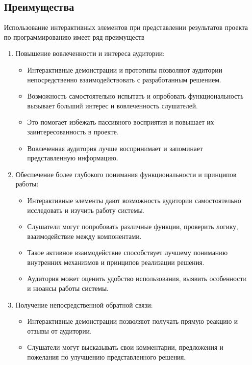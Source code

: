     \subsection{Преимущества}
    Использование интерактивных элементов при представлении результатов проекта по программированию имеет ряд преимуществ
    \begin{enumerate}
        \item Повышение вовлеченности и интереса аудитории:
            \begin{itemize}
                \item Интерактивные демонстрации и прототипы позволяют аудитории непосредственно взаимодействовать с разработанным решением.
                \item Возможность самостоятельно испытать и опробовать функциональность вызывает больший интерес и вовлеченность слушателей.
                \item Это помогает избежать пассивного восприятия и повышает их заинтересованность в проекте.
                \item Вовлеченная аудитория лучше воспринимает и запоминает представленную информацию.
            \end{itemize}
        \item Обеспечение более глубокого понимания функциональности и принципов работы:
            \begin{itemize}
                \item Интерактивные элементы дают возможность аудитории самостоятельно исследовать и изучить работу системы.
                \item Слушатели могут попробовать различные функции, проверить логику, взаимодействие между компонентами.
                \item Такое активное взаимодействие способствует лучшему пониманию внутренних механизмов и принципов реализации решения.
                \item Аудитория может оценить удобство использования, выявить особенности и нюансы работы системы.
            \end{itemize}
        \item Получение непосредственной обратной связи:
            \begin{itemize}
                \item Интерактивные демонстрации позволяют получать прямую реакцию и отзывы от аудитории.
                \item Слушатели могут высказывать свои комментарии, предложения и пожелания по улучшению представленного решения.

\end{itemize}
\end{enumerate}
